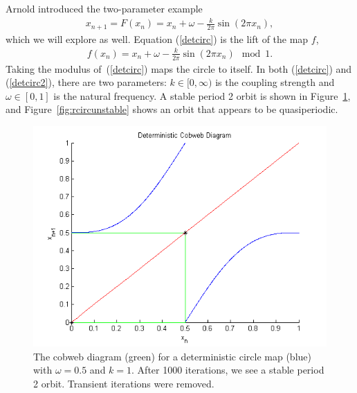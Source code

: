Arnold introduced the two-parameter example
\begin{align}\label{detcirc}
x_{n+1}= F(x_n) =  x_n + \omega - \frac{k}{2\pi}\sin(2\pi x_n),
\end{align}
which we will explore as well. Equation (\ref{detcirc}) is the lift of the map
$f$,
\begin{align}\label{detcirc2}
f(x_n) = x_n + \omega - \frac{k}{2\pi}\sin(2\pi x_n) \mod 1.
\end{align}
Taking the modulus of~(\ref{detcirc}) maps the circle
to itself. In both (\ref{detcirc}) and (\ref{detcirc2}), there are two parameters: $k \in [0,\infty)$
is the coupling strength and $\omega \in [0,1]$ is the natural frequency. A stable period 2 orbit is shown in
Figure~\ref{fig:dcircstable}, and
Figure~\ref{fig:rcircunstable} shows an orbit that appears to be quasiperiodic.
\begin{figure}[!h]
\caption[Deterministic circle map, stable orbit]{The cobweb
  diagram (green) for a deterministic circle map (blue) with $\omega =
  0.5$ and $k=1$. After 1000 iterations, we see a stable period 2 orbit. Transient iterations were removed.}\label{fig:dcircstable}
	\begin{center}
		\includegraphics[scale=0.7]{figs/detcirc_cobweb_2.png}
	\end{center}
\end{figure}
